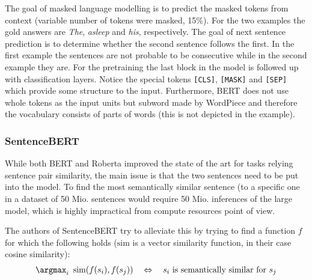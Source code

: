 \medskip
{}
\smallskip

The goal of masked language modelling is to predict the masked tokens from context (variable number of tokens were masked, 15\%).
For the two examples the gold answers are \emph{The}, \emph{asleep} and \emph{his}, respectively.
The goal of next sentence prediction is to determine whether the second sentence follows the first.
In the first example the sentences are not probable to be consecutive while in the second example they are.
For the pretraining the last block in the model is followed up with classification layers.
Notice the special tokens \texttt{[CLS]}, \texttt{[MASK]} and \texttt{[SEP]} which provide some structure to the input.
Furthermore, BERT does not use whole tokens as the input units but subword made by WordPiece \citep{wu2016google} and therefore the vocabulary consists of parts of words (this is not depicted in the example).

\subsubsection{SentenceBERT}

While both BERT and Roberta \citep{liu2019roberta} improved the state of the art for tasks relying sentence pair similarity, the main issue is that the two sentences need to be put into the model.
To find the most semantically similar sentence (to a specific one in a dataset of 50 Mio. sentences would require 50 Mio. inferences of the large model, which is highly impractical from compute resources point of view.

The authors of SentenceBERT try to alleviate this by trying to find a function $f$ for which the following holds ($\text{sim}$ is a vector similarity function, in their case cosine similarity):
\begin{gather*}
    \argmax_i \,\text{ sim}(f(s_i), f(s_j)) \quad\Leftrightarrow\quad s_i \text{ is semantically similar for } s_j
\end{gather*}

